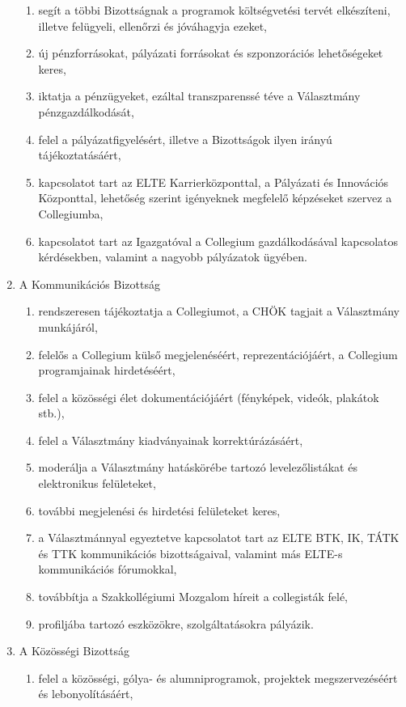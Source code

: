 \documentclass{../styles/rulebook}
\begin{document}
\begin{enumerate}
\begin{enumerate}
		\item segít a többi Bizottságnak a programok költségvetési tervét elkészíteni, illetve felügyeli, ellenőrzi és jóváhagyja ezeket,
		\item új pénzforrásokat, pályázati forrásokat és szponzorációs lehetőségeket keres,
		\item iktatja a pénzügyeket, ezáltal transzparenssé téve a Választmány pénzgazdálkodását,
		\item felel a pályázatfigyelésért, illetve a Bizottságok ilyen irányú tájékoztatásáért,
		\item kapcsolatot tart az ELTE Karrierközponttal, a Pályázati és Innovációs Központtal, lehetőség szerint igényeknek megfelelő képzéseket szervez a Collegiumba,
		\item kapcsolatot tart az Igazgatóval a Collegium gazdálkodásával kapcsolatos kérdésekben, valamint a nagyobb pályázatok ügyében.
		\end{enumerate}
	\item A Kommunikációs Bizottság
	\begin{enumerate}
		\item rendszeresen tájékoztatja a Collegiumot, a CHÖK tagjait a Választmány munkájáról,
		\item felelős a Collegium külső megjelenéséért, reprezentációjáért, a Collegium programjainak hirdetéséért,
		\item felel a közösségi élet dokumentációjáért (fényképek, videók, plakátok stb.),
		\item felel a Választmány kiadványainak korrektúrázásáért,
		\item moderálja a Választmány hatáskörébe tartozó levelezőlistákat és elektronikus felületeket,
		\item további megjelenési és hirdetési felületeket keres,
		\item a Választmánnyal egyeztetve kapcsolatot tart az ELTE BTK, IK, TÁTK és TTK kommunikációs bizottságaival, valamint más ELTE-s kommunikációs fórumokkal,
		\item továbbítja a Szakkollégiumi Mozgalom híreit a collegisták felé,
		\item profiljába tartozó eszközökre, szolgáltatásokra pályázik.
	\end{enumerate}
	\item A Közösségi Bizottság
	\begin{enumerate}
		\item felel a közösségi, gólya- és alumniprogramok, projektek megszervezéséért és lebonyolításáért,

\end{enumerate}
\end{enumerate}
\end{document}
